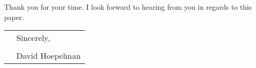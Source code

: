 \documentclass[9pt]{article}
\begin{document}
\noindent Thank you for your time. I look forward to hearing from you in regards to this paper.

\vspace{24pt}

\begin{tabular}{p{5.40in}l}
& Sincerely,\\
&\\
& David Hoepelman\\
\end{tabular}
\end{document}

